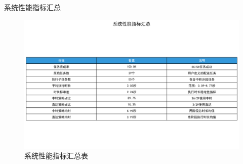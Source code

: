 \documentclass[
10pt,
aspectratio=169,
]{beamer}
\begin{document}
\begin{frame}{系统性能指标汇总}
    \begin{figure}
        \centering
        \includegraphics[width=\textwidth]{analysis_results/system_performance_table_20250617_081500.png}
        \caption{系统性能指标汇总表}
    \end{figure}
\end{frame}
\end{document}
